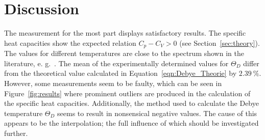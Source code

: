 \section{Discussion}
The measurement for the most part displays satisfactory results. The specific heat
capacities show the expected relation $C_{p} - C_{V} > 0$ (see Section~\ref{sec:theory}).
The values for different temperatures are close to the spectrum shown in the literature, e. g.~\cite{Arblaster2015}.
The mean of the experimentally determined values for $\Theta_{D}$ differ from the theoretical value calculated in Equation~\ref{eqn:Debye_Theorie}
by $\SI{2.39}{\percent}$.
However, some measurements seem to be faulty, which can be seen in Figure~\ref{fig:results} where
prominent outliers are produced in the calculation of the specific heat capacities.
Additionally, the method used to calculate the Debye temperature $\Theta_{D}$ seems to result in nonsensical negative
values. The cause of this appears to be the interpolation; the full influence of which should be investigated further.
